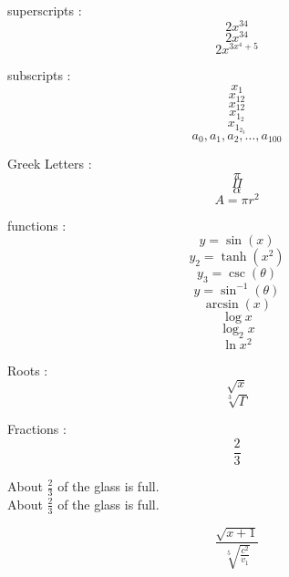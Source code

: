 \documentclass[15pt]{article}
\begin{document}
	superscripts : 
	$$2x^34$$
	$$2x^{34}$$
	$$2x^{3x^4+5}$$
	
	subscripts : 
	$$x_1$$
	$$x_12$$
	$$x_{12}$$
	$$x_{1_2}$$
	$$x_{1_{2_3}}$$
	$$a_0, a_1, a_2, \dots, a_{100}$$
	
	Greek Letters : 
	$$\pi$$
	$$\Pi$$
	$$\alpha$$
	$$A=\pi r^2$$
	
	functions : 
	$$y = \sin (x)$$
	$$y_2 = \tanh(x^2)$$
	$$y_3 = \csc(\theta)$$
	$$y=\sin^{-1}(\theta)$$
	$$\arcsin(x)$$
	$$\log x$$
	$$\log_2 x$$
	$$\ln x^2$$
	
	Roots : 
	$$\sqrt{x}$$
	$$\sqrt[3]{\Gamma}$$
	
	Fractions : 
	$$\frac{2}{3}$$
	
	About $\frac{2}{3}$ of the glass is full.
	\\[10pt]
	
	About $\displaystyle \frac{2}{3}$ of the glass is full.
	
	$$\frac{ \sqrt{x + 1} }{ \sqrt[5]{ \frac{c^2}{v_1} } }$$
	
\end{document}
